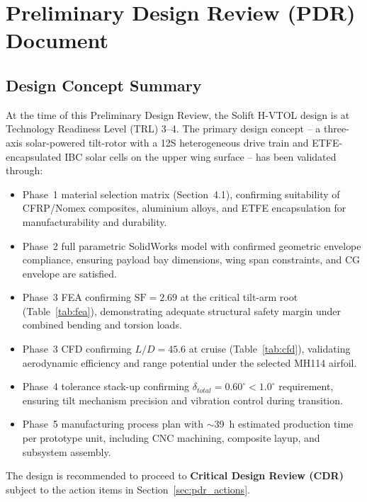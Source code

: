 \chapter{Preliminary Design Review (PDR) Document}

\section{Design Concept Summary}

At the time of this Preliminary Design Review, the Solift H-VTOL design is at Technology Readiness Level (TRL) 3--4. The primary design concept -- a three-axis solar-powered tilt-rotor with a 12S heterogeneous drive train and ETFE-encapsulated IBC solar cells on the upper wing surface -- has been validated through:

\begin{itemize}[noitemsep]
    \item Phase~1 material selection matrix (Section~4.1), confirming suitability of CFRP/Nomex composites, aluminium alloys, and ETFE encapsulation for manufacturability and durability.
    \item Phase~2 full parametric SolidWorks model with confirmed geometric envelope compliance, ensuring payload bay dimensions, wing span constraints, and CG envelope are satisfied.
    \item Phase~3 FEA confirming $\text{SF} = 2.69$ at the critical tilt-arm root (Table~\ref{tab:fea}), demonstrating adequate structural safety margin under combined bending and torsion loads.
    \item Phase~3 CFD confirming $L/D = 45.6$ at cruise (Table~\ref{tab:cfd}), validating aerodynamic efficiency and range potential under the selected MH114 airfoil.
    \item Phase~4 tolerance stack-up confirming $\delta_{total} = 0.60^\circ < 1.0^\circ$ requirement, ensuring tilt mechanism precision and vibration control during transition.
    \item Phase~5 manufacturing process plan with $\sim$39~h estimated production time per prototype unit, including CNC machining, composite layup, and subsystem assembly.
\end{itemize}

\noindent The design is recommended to proceed to \textbf{Critical Design Review (CDR)} subject to the action items in Section~\ref{sec:pdr_actions}.

